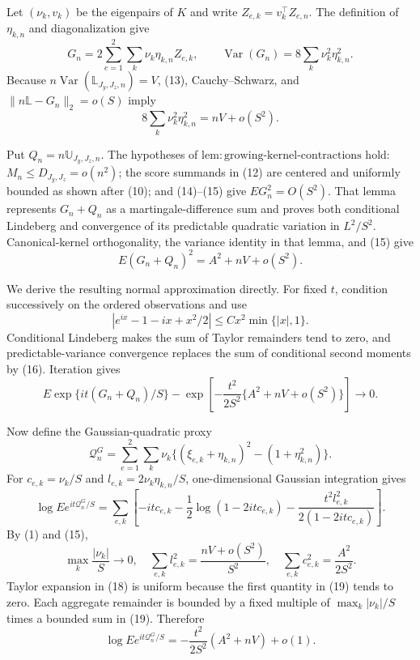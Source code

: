 Let \((\nu_k,v_k)\) be the eigenpairs of \(K\) and write \(Z_{e,k}=v_k^{\top}Z_{e,n}\). The definition of \(\eta_{k,n}\) and diagonalization give
\[
G_n=2\sum_{e=1}^2\sum_k\nu_k\eta_{k,n}Z_{e,k},
\qquad
\operatorname{Var}(G_n)=8\sum_k\nu_k^2\eta_{k,n}^2. \tag{14}
\]
Because \(n\operatorname{Var}(\mathbb L_{J_y,J_z,n})=V\), (13), Cauchy--Schwarz, and \(\|n\mathbb L-G_n\|_2=o(S)\) imply
\[
8\sum_k\nu_k^2\eta_{k,n}^2=nV+o(S^2). \tag{15}
\]

Put \(Q_n=n\mathbb U_{J_y,J_z,n}\). The hypotheses of \(\mathrm{lem{:}growing\text{-}kernel\text{-}contractions}\) hold: \(M_n\le D_{J_y,J_z}=o(n^2)\); the score summands in (12) are centered and uniformly bounded as shown after (10); and (14)--(15) give \(EG_n^2=O(S^2)\). That lemma represents \(G_n+Q_n\) as a martingale-difference sum and proves both conditional Lindeberg and convergence of its predictable quadratic variation in \(L^2/S^2\). Canonical-kernel orthogonality, the variance identity in that lemma, and (15) give
\[
E(G_n+Q_n)^2=A^2+nV+o(S^2). \tag{16}
\]

We derive the resulting normal approximation directly. For fixed \(t\), condition successively on the ordered observations and use
\[
|e^{ix}-1-ix+x^2/2|\le Cx^2\min\{|x|,1\}.
\]
Conditional Lindeberg makes the sum of Taylor remainders tend to zero, and predictable-variance convergence replaces the sum of conditional second moments by (16). Iteration gives
\[
E\exp\{it(G_n+Q_n)/S\}
-\exp\!\left[-\frac{t^2}{2S^2}\{A^2+nV+o(S^2)\}\right]\longrightarrow0. \tag{17}
\]

Now define the Gaussian-quadratic proxy
\[
\mathcal Q_n^G=\sum_{e=1}^2\sum_k\nu_k
\{(\xi_{e,k}+\eta_{k,n})^2-(1+\eta_{k,n}^2)\}.
\]
For \(c_{e,k}=\nu_k/S\) and \(l_{e,k}=2\nu_k\eta_{k,n}/S\), one-dimensional Gaussian integration gives
\[
\log Ee^{it\mathcal Q_n^G/S}
=\sum_{e,k}\left[-itc_{e,k}-\frac12\log(1-2itc_{e,k})
-\frac{t^2l_{e,k}^2}{2(1-2itc_{e,k})}\right]. \tag{18}
\]
By (1) and (15),
\[
\max_k\frac{|\nu_k|}{S}\to0,
\quad
\sum_{e,k}l_{e,k}^2=\frac{nV+o(S^2)}{S^2},
\quad
\sum_{e,k}c_{e,k}^2=\frac{A^2}{2S^2}. \tag{19}
\]
Taylor expansion in (18) is uniform because the first quantity in (19) tends to zero. Each aggregate remainder is bounded by a fixed multiple of \(\max_k|\nu_k|/S\) times a bounded sum in (19). Therefore
\[
\log Ee^{it\mathcal Q_n^G/S}
=-\frac{t^2}{2S^2}(A^2+nV)+o(1). \tag{20}
\]

